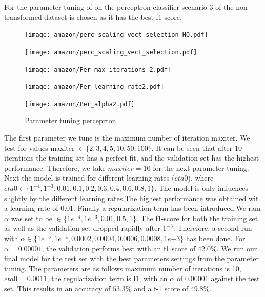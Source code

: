 \documentclass[11pt]{article}
\begin{document}
\newline
For the parameter tuning of on the perceptron classifier scenario 3 of the non-transformed dataset is chosen as it has the best f1-score.
%
\begin{figure}[t]
\begin{minipage}[t]{0.33\textwidth}
\texttt{[image: amazon/perc\_scaling\_vect\_selection\_HO.pdf]}
\end{minipage}
\begin{minipage}[t]{0.33\textwidth}
\texttt{[image: amazon/perc\_scaling\_vect\_selection.pdf]}
\end{minipage}
\begin{minipage}[t]{0.33\textwidth}
\texttt{[image: amazon/Per\_max\_iterations\_2.pdf]}
\end{minipage}
\begin{minipage}[t]{0.33\textwidth}
\texttt{[image: amazon/Per\_learning\_rate2.pdf]}
\end{minipage}
\begin{minipage}[t]{0.33\textwidth}
\texttt{[image: amazon/Per\_alpha2.pdf]}
\end{minipage}
\caption{Parameter tuning perceprton}
\label{Fig::Perceptron parametertuning}
\end{figure}
%
The first parameter we tune is the maximum number of iteration maxiter. We test for values  maxiter $\in \{2, 3, 4, 5, 10, 50, 100\}$. It can be seen that after 10 iterations the training set has a perfect fit, and the validation set has the highest performance. Therefore, we take $maxiter=10$ for the next parameter tuning.
\newline
Next the model is trained for different learning rates ($eta0$), where $ eta0 \in \{1^{-4}, 1^{-3}, 0.01, 0.1, 0.2, 0.3, 0.4, 0.6, 0.8, 1\} $. The model is only influences slightly by the different learning rates.The highest performance was obtained wit a learning rate of 0.01. 
\newline
Finally a regularization term has been introduced.We ram $\alpha$ was set to be $ \in \{ 1e^{-4}, 1e^{-3}, 0.01, 0.5, 1\}$. The f1-score for both the training set as well as the validation set dropped rapidly after $1^{-3}$. Therefore, a second run with $\alpha \in  \{1e^{-5}, 1e^{-4}, 0.0002, 0.0004, 0.0006, 0.0008, 1e{-3}\}$ has been done. For $\alpha=0.00001$, the validation performs best with an f1 score of  $42.0\%$. 
%
We run our final model for the test set with the best parameters settings from the parameter tuning. The parameters are as follows maximum number of iterations is 10, $eta0=0.0011$, the regularization term is l1, with an $\alpha$ of $0.00001$ against the test set. This results in an accuracy of $53.3\%$ and a f-1 score of $49.8\%$. 
\end{document}
